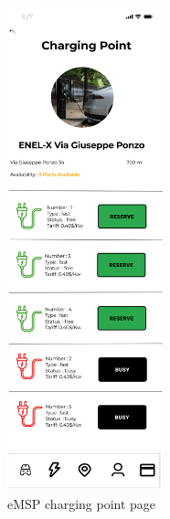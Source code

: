 \documentclass{Configuration_Files/PoliMi3i_thesis}
\begin{document}
\begin{figure}[H]
    \centering
    \includegraphics[width=0.4\textwidth]{Images/user-interface/emsp/eMSP (1)-09.png}
    \caption{eMSP charging point page}
\end{figure}
\end{document}
